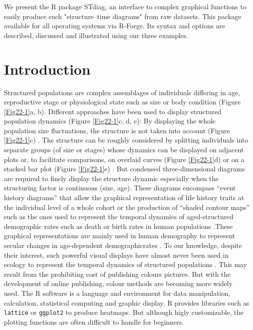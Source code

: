   We present the R package STdiag, an interface to complex graphical
  functions to easily produce such "structure--time diagrams" from raw datasets.
  This package available for all operating systems via R-Forge. Its syntax and
  options are described, discussed and illustrated using our three examples.

\section{Introduction}

Structured populations are complex assemblages of individuals differing in age,
reproductive stage or physiological state such as size or body condition (Figure
\ref{Fig22-1}a, b). Different approaches have been used to display structured
population dynamics (Figure \ref{Fig22-1}c, d, e): By displaying the whole population size fluctuations,
the structure is not taken into account (Figure \ref{Fig22-1}c) \autocite{schrautzer2011a}.
The structure can be roughly considered by splitting individuals into separate
groups (of size or stages) whose dynamics can be displayed on adjacent plots
\autocite{plaistow2009a} or, to facilitate comparisons, on overlaid curves (Figure
\ref{Fig22-1}d) or on a stacked bar plot (Figure \ref{Fig22-1}e) \autocite{madsen2000a}. But condensed
three-dimensional diagrams are required to finely display the structure dynamic
especially when the structuring factor is continuous (size, age). These diagrams
encompass “event history diagrams” that allow the graphical representation of
life history traits at the individual level of a whole
cohort\autocite{carey1998a,carey2008a} or the production of “shaded contour
maps” such as the ones used to represent the temporal dynamics of
aged-structured demographic rates such as death or birth rates in human
populations \autocite{vaupel1997a,vaupel1998a}.These graphical representations
are mainly used in human demography to represent secular changes in
age-dependent demographicrates
\autocite{vaupel1987a,vaupel1997a,vaupel1998a,andreev2000a,erlangsen2003a}.
To our knowledge, despite their interest, such powerful visual displays have
almost never been used in ecology to represent the temporal dynamics of
structured populations \autocite{faerovig2002a}. This may result from the
prohibiting cost of publishing colours pictures. But with the development of
online publishing, colour methods are becoming more widely used.
The R software \autocite{team2012a} is a language and environment for data
manipulation, calculation, statistical computing and graphic display. R provides
libraries such as \texttt{lattice} \autocite{sarkar2008a} or \texttt{ggplot2}
\autocite{wickham2009a} to produce heatmaps.
But although higly customizable, the plotting functions are often difficult to
handle for beginners.

